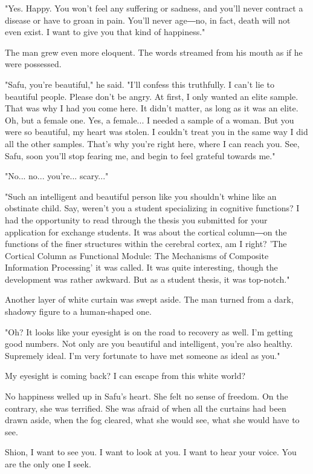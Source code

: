 "Yes. Happy. You won't feel any suffering or sadness, and you'll never
contract a disease or have to groan in pain. You'll never age―no, in
fact, death will not even exist. I want to give you that kind of
happiness."

The man grew even more eloquent. The words streamed from his mouth as if
he were possessed.

"Safu, you're beautiful," he said. "I'll confess this truthfully. I
can't lie to beautiful people. Please don't be angry. At first, I only
wanted an elite sample. That was why I had you come here. It didn't
matter, as long as it was an elite. Oh, but a female one. Yes, a
female... I needed a sample of a woman. But you were so beautiful, my
heart was stolen. I couldn't treat you in the same way I did all the
other samples. That's why you're right here, where I can reach you. See,
Safu, soon you'll stop fearing me, and begin to feel grateful towards
me."

"No... no... you're... scary..."

"Such an intelligent and beautiful person like you shouldn't whine like
an obstinate child. Say, weren't you a student specializing in cognitive
functions? I had the opportunity to read through the thesis you
submitted for your application for exchange students. It was about the
cortical column―on the functions of the finer structures within the
cerebral cortex, am I right? 'The Cortical Column as Functional Module:
The Mechanisms of Composite Information Processing' it was called. It
was quite interesting, though the development was rather awkward. But as
a student thesis, it was top-notch."

Another layer of white curtain was swept aside. The man turned from a
dark, shadowy figure to a human-shaped one.

"Oh? It looks like your eyesight is on the road to recovery as well. I'm
getting good numbers. Not only are you beautiful and intelligent, you're
also healthy. Supremely ideal. I'm very fortunate to have met someone as
ideal as you."

My eyesight is coming back? I can escape from this white world?

No happiness welled up in Safu's heart. She felt no sense of freedom. On
the contrary, she was terrified. She was afraid of when all the curtains
had been drawn aside, when the fog cleared, what she would see, what she
would have to see.

Shion, I want to see you. I want to look at you. I want to hear your
voice. You are the only one I seek.

